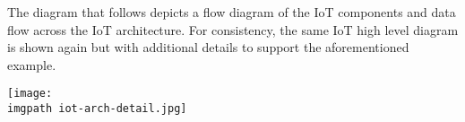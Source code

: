 The diagram that follows depicts a flow diagram of the IoT components and data flow
across the IoT architecture. For consistency, the same IoT high level diagram
is shown again but with additional details to support the aforementioned example.

    \begin{minipage}[t]{\linewidth}
	  \centering
      \texttt{[image: \\imgpath iot-arch-detail.jpg]}
    \end{minipage}
